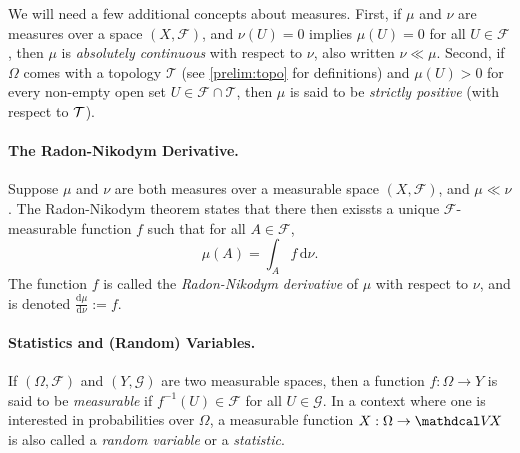 We will need a few additional concepts about measures.
First, if $\mu$ and $\nu$ are measures over a space $(X, \mathcal F)$, 
and $\nu(U) = 0$ implies $\mu(U) = 0$ for all $U \in \mathcal F$, then
$\mu$ is \emph{absolutely continuous} with respect to $\nu$, also written $\nu \ll \mu$.
Second, if $\Omega$ comes with a topology $\mathcal T$ (see \cref{prelim:topo} for definitions) and $\mu(U) > 0$ for every non-empty open set $U \in \mathcal F \cap \mathcal T$, then $\mu$ is said to be \emph{strictly positive} (with respect to $\cal T$).


\paragraph{The Radon-Nikodym Derivative.}
Suppose $\mu$ and $\nu$ are both measures over a measurable space $(X,\mathcal F)$, and $\mu \ll \nu$. 
The Radon-Nikodym theorem states that there then exissts a unique $\mathcal F$-measurable function $f$
such that for all $A \in \mathcal F$,
\[
    \mu(A) = \int_{A} f \,\mathrm d \nu.
\]
The function $f$ is called the \emph{Radon-Nikodym derivative} of $\mu$ with respect to $\nu$, and is denoted $\frac{\mathrm d\mu}{\mathrm d\nu} := f$.




\paragraph{Statistics and (Random) Variables.} 
If $(\Omega, \mathcal F)$ and $(Y, \mathcal G)$ are two measurable spaces, then
a function $f : \Omega \to Y$ is said to be \emph{measurable} if $f^{-1}(U) \in \mathcal F$ for all $U \in \mathcal G$. 
In a context where one is interested in probabilities over $\Omega$, 
a measurable function $X : \Omega \to \V\!X$ is also called a \emph{random variable} or a \emph{statistic}.


